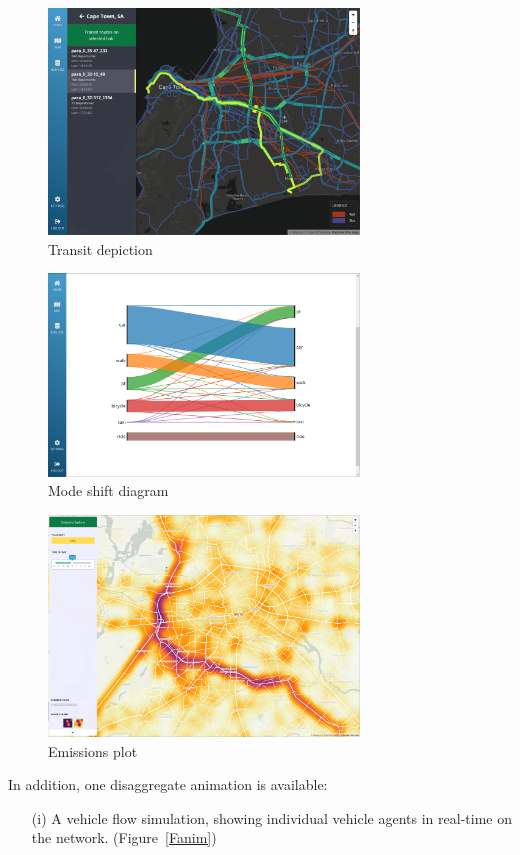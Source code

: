 \documentclass[Afour,sagev,times]{sagej}
\begin{document}
\begin{figure}
\centering
\includegraphics[width=3.25in]{fig-4.png}
\caption{Transit depiction}\label{Ftransit}
\end{figure}

\begin{figure}
\centering
\includegraphics[width=3.25in]{fig-5.png}
\caption{Mode shift diagram}\label{Fsankey}
\end{figure}

\begin{figure}
\centering
\includegraphics[width=3.25in]{fig-6.png}
\caption{Emissions plot}\label{Femissions}
\end{figure}

In addition, one disaggregate animation is available:

\begin{enumerate}

\item[(i)] A vehicle flow simulation, showing individual vehicle agents in real-time on the network. (Figure~\ref{Fanim})

\end{enumerate}
\end{document}
